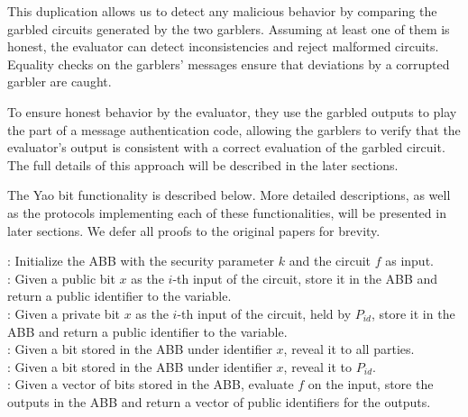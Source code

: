 This duplication allows us to detect any malicious behavior by comparing the garbled circuits generated by the two garblers. Assuming at
least one of them is honest, the evaluator can detect inconsistencies and reject malformed circuits. Equality checks on the garblers'
messages ensure that deviations by a corrupted garbler are caught. 

To ensure honest behavior by the evaluator, they use the garbled outputs to play the part of a message authentication code, allowing the
garblers to verify that the evaluator’s output is consistent with a correct evaluation of the garbled circuit. The full details of this
approach will be described in the later sections.

The Yao bit functionality is described below. More detailed descriptions, as well as the protocols implementing each of these
functionalities, will be presented in later sections. We defer all proofs to the original papers for brevity.



\begin{functionality}
	
	: Initialize the ABB with the security parameter $k$ and the circuit $f$ as input. \\
	
	:  Given a public bit $x$ as the $i$-th input of the circuit, store it in the ABB and return a public identifier to the variable. \\
	
	:  Given a private bit $x$ as the $i$-th input of the circuit, held by $P_{id}$, store it in the ABB and return a public identifier to the variable. \\
	
	: Given a bit stored in the ABB under identifier $x$,
	reveal it to all parties. \\
	
	: Given a bit stored in the ABB under identifier $x$,
	reveal it to $P_{id}$. \\
	
	: Given a vector of bits stored in the ABB, evaluate $f$ on the input, store the outputs in the ABB and return a vector of public identifiers for the outputs.
	
\end{functionality}

